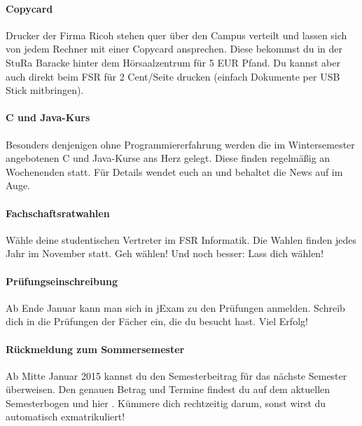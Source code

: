 \paragraph{Copycard}
Drucker der Firma Ricoh stehen quer über den Campus verteilt und lassen sich von jedem Rechner mit einer Copycard ansprechen.
Diese bekommst du in der StuRa Baracke hinter dem Hörsaalzentrum für 5 EUR Pfand. Du kannst aber auch direkt beim FSR für 2 Cent/Seite drucken (einfach Dokumente per USB Stick mitbringen).

\paragraph{C und Java-Kurs}
Besonders denjenigen ohne Programmiererfahrung werden die im Wintersemester angebotenen C und Java-Kurse ans Herz gelegt.
Diese finden regelmäßig an Wochenenden statt.
Für Details wendet euch an \link{\textcolor{red}{NONE}} und behaltet die News auf \link{\textcolor{red}{NONE}} im Auge.

\paragraph{Fachschaftsratwahlen}
Wähle deine studentischen Vertreter im FSR Informatik.
Die Wahlen finden jedes Jahr im November statt.
Geh wählen!
Und noch besser: Lass dich wählen!

\paragraph{Prüfungseinschreibung}
Ab Ende Januar kann man sich in jExam zu den Prüfungen anmelden.
Schreib dich in die Prüfungen der Fächer ein, die du besucht hast.
Viel Erfolg!

\paragraph{Rückmeldung zum Sommersemester}
Ab Mitte Januar 2015 kannst du den Semesterbeitrag für das nächste Semester überweisen.
Den genauen Betrag und Termine findest du auf dem aktuellen Semesterbogen und hier \link{\textcolor{red}{NONE}}.
Kümmere dich rechtzeitig darum, sonst wirst du automatisch exmatrikuliert!

